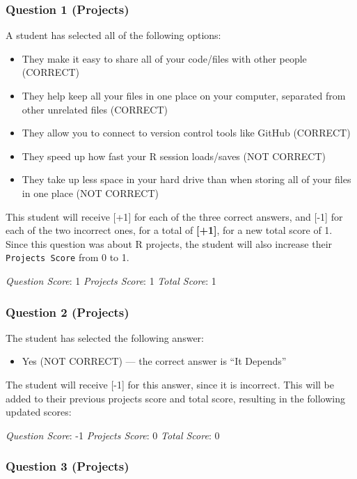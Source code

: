 \documentclass[12pt,twoside]{reedthesis}
\providecommand{\tightlist}{%
  \setlength{\itemsep}{0pt}\setlength{\parskip}{0pt}}
\begin{document}
\hypertarget{question-1-projects-1}{%
\subsubsection{Question 1 (Projects)}\label{question-1-projects-1}}

A student has selected all of the following options:
\begin{itemize}
\tightlist
\item
  They make it easy to share all of your code/files with other people (CORRECT)
\item
  They help keep all your files in one place on your computer, separated from other unrelated files (CORRECT)
\item
  They allow you to connect to version control tools like GitHub (CORRECT)
\item
  They speed up how fast your R session loads/saves (NOT CORRECT)
\item
  They take up less space in your hard drive than when storing all of your files in one place (NOT CORRECT)
\end{itemize}
This student will receive {[}+1{]} for each of the three correct answers, and {[}-1{]} for each of the two incorrect ones, for a total of \textbf{{[}+1{]}}, for a new total score of 1. Since this question was about R projects, the student will also increase their \texttt{Projects\ Score} from 0 to 1.

\emph{Question Score}: 1 \emph{Projects Score}: 1 \emph{Total Score}: 1

\hypertarget{question-2-projects-1}{%
\subsubsection{Question 2 (Projects)}\label{question-2-projects-1}}

The student has selected the following answer:
\begin{itemize}
\tightlist
\item
  Yes (NOT CORRECT) --- the correct answer is ``It Depends''
\end{itemize}
The student will receive {[}-1{]} for this answer, since it is incorrect. This will be added to their previous projects score and total score, resulting in the following updated scores:

\emph{Question Score}: -1 \emph{Projects Score}: 0 \emph{Total Score}: 0

\hypertarget{question-3-projects-1}{%
\subsubsection{Question 3 (Projects)}\label{question-3-projects-1}}
\end{document}
